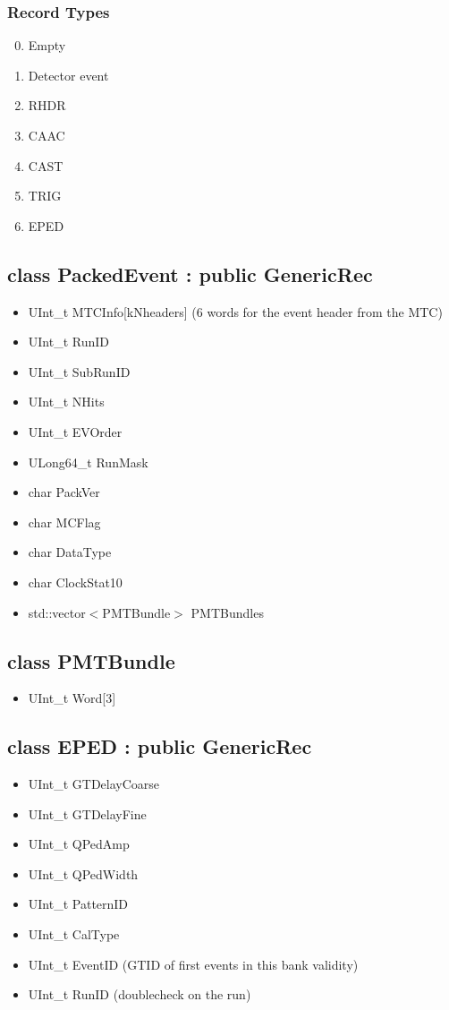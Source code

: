 \documentclass{article}
\begin{document}
\subsubsection{Record Types}
\begin{enumerate}
\setcounter{enumi}{-1}
\item Empty
\item Detector event
\item RHDR
\item CAAC
\item CAST
\item TRIG
\item EPED
\end{enumerate}

\subsection{class PackedEvent : public GenericRec}
\begin{itemize}
\item UInt\_t MTCInfo[kNheaders] (6 words for the event header from the MTC)
\item UInt\_t RunID
\item UInt\_t SubRunID
\item UInt\_t NHits
\item UInt\_t EVOrder
\item ULong64\_t RunMask
\item char PackVer
\item char MCFlag
\item char DataType
\item char ClockStat10 
\item std::vector$<$PMTBundle$>$ PMTBundles
\end{itemize}

\subsection{class PMTBundle}
\begin{itemize}
\item UInt\_t Word[3] 
\end{itemize}

\subsection{class EPED : public GenericRec}
\begin{itemize}
\item UInt\_t GTDelayCoarse
\item UInt\_t GTDelayFine
\item UInt\_t QPedAmp
\item UInt\_t QPedWidth
\item UInt\_t PatternID
\item UInt\_t CalType
\item UInt\_t EventID (GTID of first events in this bank validity)
\item UInt\_t RunID (doublecheck on the run)
\end{itemize}
\end{document}
